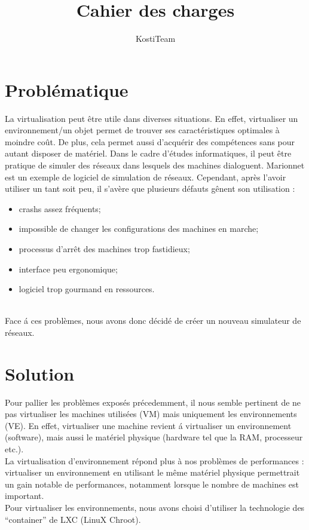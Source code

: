 \documentclass[a4paper]{article}
\author{KostiTeam}
\title{Cahier des charges}
\begin{document}
\maketitle
\newpage
\tableofcontents
\newpage

\section{Probl\'ematique}
La virtualisation peut \^etre utile dans diverses situations. En effet, virtualiser un environnement/un objet permet de trouver ses caract\'eristiques optimales \`a moindre co\^ut. De plus, cela permet aussi d'acqu\'erir des comp\'etences sans pour autant disposer de mat\'eriel. Dans le cadre d'\'etudes informatiques, il peut \^etre pratique de simuler des r\'eseaux dans lesquels des machines dialoguent. Marionnet est un exemple de logiciel de simulation de r\'eseaux. Cependant, apr\`es l'avoir utiliser un tant soit peu, il s'av\`ere que plusieurs d\'efauts g\^enent son utilisation : 
\begin{itemize}
  \item crashs assez fr\'equents;
  \item impossible de changer les configurations des machines en marche;
  \item processus d'arr\^et des machines trop fastidieux;
  \item interface peu ergonomique;
  \item logiciel trop gourmand en ressources.
\end{itemize}

\\
Face \'a ces probl\`emes, nous avons donc d\'ecid\'e de cr\'eer un nouveau simulateur de r\'eseaux.

\section{Solution}
Pour pallier les probl\`emes expos\'es pr\'ecedemment, il nous semble pertinent de ne pas virtualiser les machines utilis\'ees  (VM) mais uniquement les environnements (VE). En effet, virtualiser une machine revient \'a virtualiser un environnement (software), mais aussi le mat\'eriel physique (hardware tel que la RAM, processeur etc.).\\La virtualisation d'environnement r\'epond plus \`a nos probl\`emes de performances :  virtualiser un environnement en utilisant le m\^eme mat\'eriel physique permettrait un gain notable de performances, notamment lorsque le nombre de machines est important. \\
Pour virtualiser les environnements, nous avons choisi d'utiliser la technologie des ``container'' de LXC (LinuX Chroot).
\end{document}

